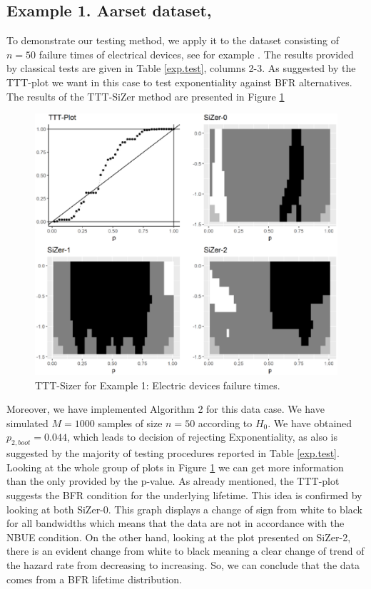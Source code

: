 \documentclass[preprint,12pt]{elsarticle}
\begin{document}
\subsection*{Example 1. Aarset dataset, \cite{A1987}}
To demonstrate our testing method, we apply it to the dataset consisting of $n=50$ failure times of electrical devices, see for example \cite{A1987}. The results provided by classical tests are given in Table \ref{exp.test}, columns 2-3.
As suggested by the TTT-plot we want in this case to test exponentiality against BFR alternatives. The results of the TTT-SiZer method are presented in Figure \ref{Fig:aarset}
\begin{figure}[h]
\begin{center}
\includegraphics[height= 0.7\textwidth]{aarsetCubicPuntual_log10.EPS}
\caption{TTT-Sizer for Example 1: Electric devices failure times.}\label{Fig:aarset}
\end{center}
\end{figure}
%
Moreover, we have implemented Algorithm 2 for this data case. We have simulated $M=1000$ samples of size $n=50$ according to $H_0$. We have obtained $p_{2,boot}=0.044$, which leads to decision of rejecting Exponentiality, as also is suggested by the majority of testing procedures reported in Table \ref{exp.test}. Looking at the whole group of plots in Figure \ref{Fig:aarset} we can get more information than the only provided by the p-value. As already mentioned, the TTT-plot suggests the BFR condition for the underlying lifetime. This idea is confirmed by looking at both SiZer-0. This graph displays a change of sign from white to black for all bandwidths which means that the data are not in accordance with the NBUE condition. On the other hand, looking at the plot presented on SiZer-2, there is an evident change from white to black meaning a clear change of trend of the hazard rate from decreasing to increasing. So, we can conclude that the data comes from a BFR lifetime distribution. 
\end{document}
